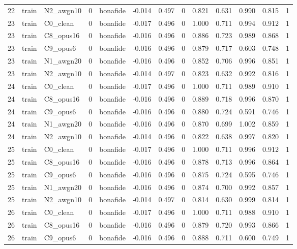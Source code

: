 \begin{tabular}{rllrlrrrrrrrr}
22 & train & N2_awgn10 & 0 & bonafide & -0.014 & 0.497 & 0 & 0.821 & 0.631 & 0.990 & 0.815 & 1 \\
23 & train & C0_clean & 0 & bonafide & -0.017 & 0.496 & 0 & 1.000 & 0.711 & 0.994 & 0.912 & 1 \\
23 & train & C8_opus16 & 0 & bonafide & -0.016 & 0.496 & 0 & 0.886 & 0.723 & 0.989 & 0.868 & 1 \\
23 & train & C9_opus6 & 0 & bonafide & -0.016 & 0.496 & 0 & 0.879 & 0.717 & 0.603 & 0.748 & 1 \\
23 & train & N1_awgn20 & 0 & bonafide & -0.016 & 0.496 & 0 & 0.852 & 0.706 & 0.996 & 0.851 & 1 \\
23 & train & N2_awgn10 & 0 & bonafide & -0.014 & 0.497 & 0 & 0.823 & 0.632 & 0.992 & 0.816 & 1 \\
24 & train & C0_clean & 0 & bonafide & -0.017 & 0.496 & 0 & 1.000 & 0.711 & 0.989 & 0.910 & 1 \\
24 & train & C8_opus16 & 0 & bonafide & -0.016 & 0.496 & 0 & 0.889 & 0.718 & 0.996 & 0.870 & 1 \\
24 & train & C9_opus6 & 0 & bonafide & -0.016 & 0.496 & 0 & 0.880 & 0.724 & 0.591 & 0.746 & 1 \\
24 & train & N1_awgn20 & 0 & bonafide & -0.016 & 0.496 & 0 & 0.870 & 0.699 & 1.002 & 0.859 & 1 \\
24 & train & N2_awgn10 & 0 & bonafide & -0.014 & 0.496 & 0 & 0.822 & 0.638 & 0.997 & 0.820 & 1 \\
25 & train & C0_clean & 0 & bonafide & -0.017 & 0.496 & 0 & 1.000 & 0.711 & 0.996 & 0.912 & 1 \\
25 & train & C8_opus16 & 0 & bonafide & -0.016 & 0.496 & 0 & 0.878 & 0.713 & 0.996 & 0.864 & 1 \\
25 & train & C9_opus6 & 0 & bonafide & -0.016 & 0.496 & 0 & 0.875 & 0.724 & 0.595 & 0.746 & 1 \\
25 & train & N1_awgn20 & 0 & bonafide & -0.016 & 0.496 & 0 & 0.874 & 0.700 & 0.992 & 0.857 & 1 \\
25 & train & N2_awgn10 & 0 & bonafide & -0.014 & 0.497 & 0 & 0.814 & 0.630 & 0.999 & 0.814 & 1 \\
26 & train & C0_clean & 0 & bonafide & -0.017 & 0.496 & 0 & 1.000 & 0.711 & 0.988 & 0.910 & 1 \\
26 & train & C8_opus16 & 0 & bonafide & -0.016 & 0.496 & 0 & 0.879 & 0.720 & 0.993 & 0.866 & 1 \\
26 & train & C9_opus6 & 0 & bonafide & -0.016 & 0.496 & 0 & 0.888 & 0.711 & 0.600 & 0.749 & 1 \\

\end{tabular}

